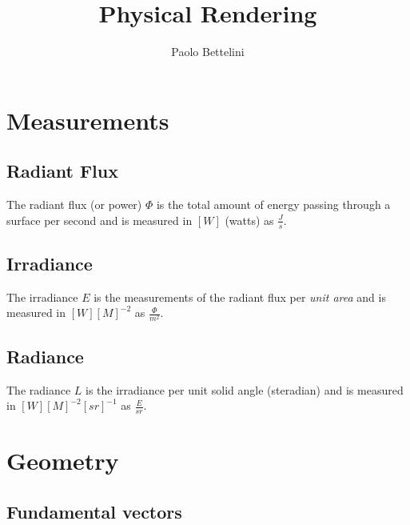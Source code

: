 \documentclass{article}
\title{Physical Rendering}
\author{Paolo Bettelini}
\date{}
\begin{document}
\maketitle
\tableofcontents
\pagebreak

\section{Measurements}

\subsection{Radiant Flux}

The radiant flux (or power) \(\Phi\) is the total amount of energy passing
through a surface per second and is measured in \([W]\) (watts) as \(\frac{J}{s}\).

\subsection{Irradiance}

The irradiance \(E\) is the measurements of the radiant flux per \textit{unit area}
and is measured in \([W]{[M]}^{-2}\) as \(\frac{\Phi}{m^2}\).

\subsection{Radiance}

The radiance \(L\) is the irradiance per unit solid angle (steradian) and is
measured in \([W]{[M]}^{-2}{[sr]}^{-1}\) as \(\frac{E}{sr}\).

\section{Geometry}

\subsection{Fundamental vectors}

\begin{center}
\end{center}
\end{document}
